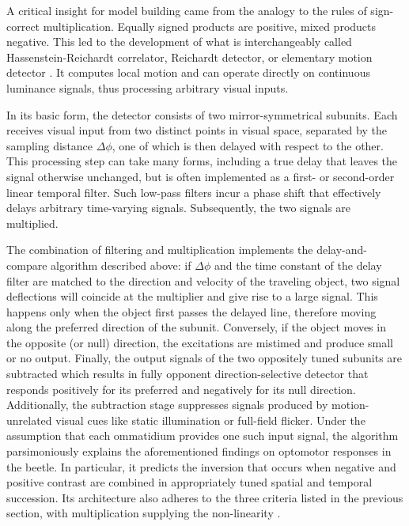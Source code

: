 A critical insight for model building came from the analogy to the rules of sign-correct multiplication. Equally signed products are positive, mixed products negative. This led to the development of what is interchangeably called Hassenstein-Reichardt correlator, Reichardt detector, or elementary motion detector \citep{Reichardt:1961aa}. It computes local motion and can operate directly on continuous luminance signals, thus processing arbitrary visual inputs.

In its basic form, the detector consists of two mirror-symmetrical subunits. Each receives visual input from two distinct points in visual space, separated by the sampling distance $\Delta\phi$, one of which is then delayed with respect to the other. This processing step can take many forms, including a true delay that leaves the signal otherwise unchanged, but is often implemented as a first- or second-order linear temporal filter. Such low-pass filters incur a phase shift that effectively delays arbitrary time-varying signals. Subsequently, the two signals are multiplied.

The combination of filtering and multiplication implements the delay-and-compare algorithm described above: if $\Delta\phi$ and the time constant of the delay filter are matched to the direction and velocity of the traveling object, two signal deflections will coincide at the multiplier and give rise to a large signal. This happens only when the object first passes the delayed line, therefore moving along the preferred direction of the subunit. Conversely, if the object moves in the opposite (or null) direction, the excitations are mistimed and produce small or no output. Finally, the output signals of the two oppositely tuned subunits are subtracted which results in fully opponent direction-selective detector that responds positively for its preferred and negatively for its null direction. Additionally, the subtraction stage suppresses signals produced by motion-unrelated visual cues like static illumination or full-field flicker. Under the assumption that each ommatidium provides one such input signal, the algorithm parsimoniously explains the aforementioned findings on optomotor responses in the beetle. In particular, it predicts the inversion that occurs when negative and positive contrast are combined in appropriately tuned spatial and temporal succession. Its architecture also adheres to the three criteria listed in the previous section, with multiplication supplying the non-linearity \citep{Borst:1989vp}.

